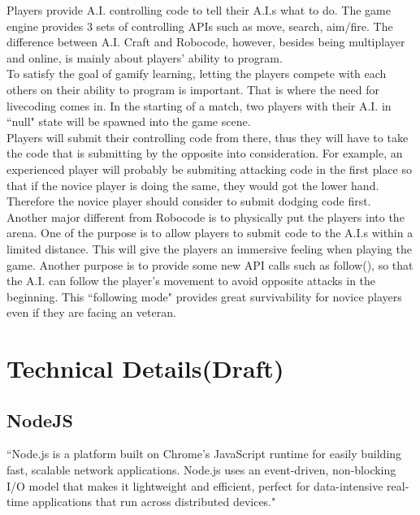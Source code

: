 \documentclass[12pt]{article}
\begin{document}
Players provide A.I. controlling code to tell their A.I.s what to do. The game engine provides 3 sets of controlling APIs such as move, search, aim/fire. The difference between A.I. Craft and Robocode, however, besides being multiplayer and online, is mainly about players' ability to program.\\

To satisfy the goal of gamify learning, letting the players compete with each others on their ability to program is important. That is where the need for livecoding comes in. In the starting of a match, two players with their A.I. in ``null" state will be spawned into the game scene.\\ 

Players will submit their controlling code from there, thus they will have to take the code that is submitting by the opposite into consideration. For example, an experienced player will probably be submiting attacking code in the first place so that if the novice player is doing the same, they would got the lower hand. Therefore the novice player should consider to submit dodging code first.\\ 

Another major different from Robocode is to physically put the players into the arena. One of the purpose is to allow players to submit code to the A.I.s within a limited distance. This will give the players an immersive feeling when playing the game. Another purpose is to provide some new API calls such as follow(), so that the A.I. can follow the player's movement to avoid opposite attacks in the beginning. This ``following mode" provides great survivability for novice players even if they are facing an veteran. 



\section{Technical Details(Draft)}

\subsection{NodeJS}
``Node.js is a platform built on Chrome's JavaScript runtime for easily building fast, scalable network applications. Node.js uses an event-driven, non-blocking I/O model that makes it lightweight and efficient, perfect for data-intensive real-time applications that run across distributed devices."\cite{nodejs}\\
\end{document}
